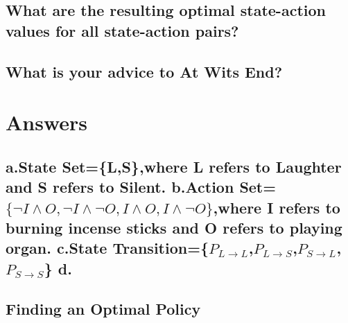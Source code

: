 \documentclass{article}
\begin{document}
\subsection{What are the resulting optimal state-action values for all state-action pairs?}

\subsection{What is your advice to At Wits End?}


\newpage
{}

\section{Answers}

\subsection{a.State Set=\{L,S\},where L refers to Laughter and S refers to Silent.\newline
	     b.Action Set=$\{ \neg I \land O , \neg I \land \neg O,  I \land O, I \land \neg O\}$,where I refers to burning incense sticks and O refers to playing organ.\newline
             c.State Transition=\{$P_{L \to L}$,$P_{L \to S}$,$P_{S \to L}$, $P_{S \to S}$\}\newline
d.}
\subsection{Finding an Optimal Policy}
\end{document}
